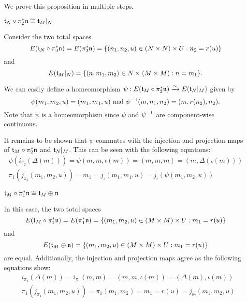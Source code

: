 \begin{myproof}
    We prove this proposition in multiple steps.
    \begin{steps}
        \item $\mathfrak{t}_N \circ \pi_2^*\mathfrak{n} \cong \mathfrak{t}_M\vert_{N}$
        
        Consider the two total spaces
        \[ E(\mathfrak{t}_N \circ \pi_2^*\mathfrak{n}) = E(\pi_2^*\mathfrak{n}) = \{(n_1, n_2, u) \in (N \times N) \times U:n_2 = r(u)\} \]
        and
        \[ E(\mathfrak{t}_M\vert_{N}) = \{(n, m_1, m_2) \in N \times (M \times M):n = m_1\}. \]

        We can easily define a homeomorphism $\psi: E(\mathfrak{t}_M \circ \pi_2^*\mathfrak{n}) \xrightarrow{\sim} E(\mathfrak{t}_N\vert_{M})$ given by
        \[ \psi(m_1, m_2, u) = (m_1, m_1, u) \text{ and } \psi^{-1}(m, n_1, n_2) = (m, r(n_2), n_2). \]
        Note that $\psi$ is a homeomorphism since $\psi$ and $\psi^{-1}$ are component-wise continuous.

        It remains to be shown that $\psi$
        commutes with the injection and projection maps of $\mathfrak{t}_M \circ \pi_2^*\mathfrak{n}$ and $\mathfrak{t}_N\vert_{M}$.
        This can be seen with the following equations:
        \begin{align}
            \psi(i_{\pi_2}(\Delta(m))) = \psi(m, m, \iota(m)) = (m, m, m) = (m, \Delta(\iota(m))) \\
            \pi_1(j_{\pi_2}(m_1, m_2, u)) = m_1 = j_\iota(m_1, m_1, u) = j_\iota(\psi(m_1, m_2, u)) 
        \end{align}
        
        \item $\mathfrak{t}_M \circ \pi_1^*\mathfrak{n} \cong \mathfrak{t}_M \oplus{} \mathfrak{n}$
        
        In this case, the two total spaces
        \[ E(\mathfrak{t}_M \circ \pi_1^*\mathfrak{n}) = E(\pi_1^*\mathfrak{n}) = \{(m_1, m_2, u) \in (M \times M) \times U:m_1 = r(u)\} \]
        and
        \[ E(\mathfrak{t}_M \oplus{} \mathfrak{n}) = \{(m_1, m_2, u) \in (M \times M) \times U:m_1 = r(u)\} \]
        are equal.
        Additionally,
        the injection and projection maps agree as the following equations show:
        \begin{align}
            & i_{\pi_1}(\Delta(m)) = i_{\pi_1}(m, m) = (m, m, \iota(m)) = (\Delta(m), \iota(m)) \\
            & \pi_1(j_{\pi_1}(m_1, m_2, u)) = \pi_1(m_1, m_2) = m_1 = r(u) = j_{\oplus}(m_1, m_2, u)
        \end{align}


\end{steps}
\end{myproof}
